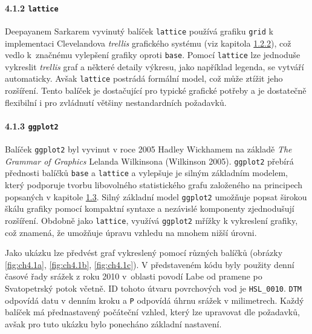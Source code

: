 \documentclass[12pt,]{article}
\let\oldparagraph\paragraph
\renewcommand{\paragraph}[1]{\oldparagraph{#1}\mbox{}}
\begin{document}
\hypertarget{lattice}{\paragraph{\texorpdfstring{4.1.2
\texttt{lattice}}{4.1.2 lattice}}\label{lattice}}

\qquad Deepayanem Sarkarem vyvinutý balíček \texttt{lattice} používá
grafiku \texttt{grid} k implementaci Clevelandova \emph{trellis}
grafického systému (viz kapitola \protect\hyperlink{cleveland}{1.2.2}),
což vedlo k~značnému vylepšení grafiky oproti \texttt{base}. Pomocí
\texttt{lattice} lze jednoduše vykreslit \emph{trellis} graf a některé
detaily výkresu, jako například legenda, se vytváří automaticky. Avšak
\texttt{lattice} postrádá formální model, což může ztížit jeho
rozšíření. Tento balíček je dostačující pro typické grafické potřeby a
je dostatečně flexibilní i pro zvládnutí většiny nestandardních
požadavků.

\hypertarget{ggplot}{\paragraph{\texorpdfstring{4.1.3
\texttt{ggplot2}}{4.1.3 ggplot2}}\label{ggplot}}

\qquad Balíček \texttt{ggplot2} byl vyvinut v roce 2005 Hadley Wickhamem
na základě \emph{The Grammar of Graphics} Lelanda Wilkinsona (Wilkinson
2005). \texttt{ggplot2} přebírá přednosti balíčků \texttt{base} a
\texttt{lattice} a vylepšuje je silným základním modelem, který
podporuje tvorbu libovolného statistického grafu založeného na
principech popsaných v kapitole \protect\hyperlink{gg}{1.3}. Silný
základní model \texttt{ggplot2} umožňuje popsat širokou škálu grafiky
pomocí kompaktní syntaxe a nezávislé komponenty zjednodušují rozšíření.
Obdobně jako \texttt{lattice}, využívá \texttt{ggplot2} mřížky k
vykreslení grafiky, což znamená, že umožňuje úpravu vzhledu na mnohem
nižší úrovni.

\qquad Jako ukázku lze předvést graf vykreslený pomocí různých balíčků
(obrázky \ref{fig:ch4.1a}, \ref{fig:ch4.1b}, \ref{fig:ch4.1c}). V
představeném kódu byly použity denní časové řady srážek z roku 2010
v~oblasti povodí Labe od pramene po Svatopetrský potok včetně. ID tohoto
útvaru povrchových vod je \texttt{HSL\_0010}. \texttt{DTM} odpovídá datu
v denním kroku a \texttt{P} odpovídá úhrnu srážek v milimetrech. Každý
balíček má přednastavený počáteční vzhled, který lze upravovat dle
požadavků, avšak pro tuto ukázku bylo ponecháno základní nastavení.
\end{document}
